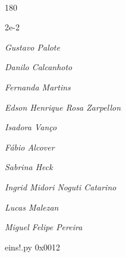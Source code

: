 \documentclass[12pt]{article}
\begin{document}

\pagebreak			

	\ 
	\vfill
	\begin{turn}{180}	
		\begin{minipage}{\textwidth}
		  	\ttfamily %
			\centering
			{\Huge 2e-2}
		  
			\hfill
		  
			

\textit{\small Gustavo Palote}

\textit{\small Danilo Calcanhoto}

\textit{\small Fernanda Martins}

\textit{\small Edson Henrique Rosa Zarpellon}

\textit{\small Isadora Vanço}

\textit{\small Fábio Alcover}

\textit{\small Sabrina Heck}

\textit{\small Ingrid Midori Noguti Catarino}

\textit{\small Lucas Malezan}

\textit{\small Miguel Felipe Pereira}

\bigskip

eins!.py
0x0012


		\end{minipage}	
	\end{turn}
	\vfill
	\

\pagebreak
\end{document}
